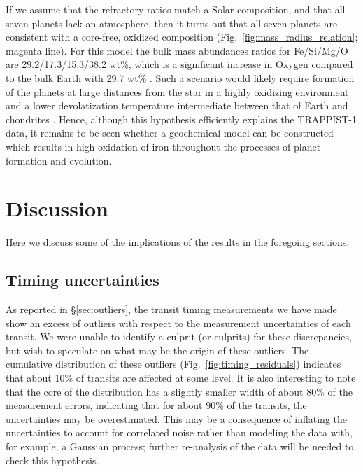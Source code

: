 \documentclass[twocolumn]{aastex63}
\begin{document}
If we assume that the refractory ratios match a Solar composition, and that all seven planets lack an atmosphere, then it turns out that all seven planets are consistent with a core-free, oxidized composition (Fig.\ \ref{fig:mass_radius_relation}; magenta line).  For this model the bulk mass abundances ratios for Fe/Si/Mg/O are 29.2/17.3/15.3/38.2 wt\%, which is a significant increase in Oxygen compared to the bulk Earth with 29.7 wt\% \citep{McDonough2014}.
Such a scenario would likely require formation of the planets at large distances from the star in a highly oxidizing environment \citep{ElkinsTanton2008} and a lower  devolatization temperature intermediate between that of Earth and chondrites \citep{Wang2019}.  Hence, although this hypothesis efficiently explains the TRAPPIST-1 data, it remains to be seen whether a geochemical model can be constructed which results in high oxidation of iron throughout the processes of planet formation and evolution.

\section{Discussion} \label{sec:discussion}

Here we discuss some of the implications of the results in the foregoing sections.

\subsection{Timing uncertainties}

As reported in \S \ref{sec:outliers}, the transit timing measurements we have made show an excess of outliers with respect to the measurement uncertainties of each transit.  We were unable to identify a culprit (or culprits) for these discrepancies, but wish to speculate on what may be the origin of these outliers.  The cumulative distribution of these outliers (Fig.\ \ref{fig:timing_residuals}) indicates that about 10\% of transits
are affected at some level.  It is also interesting to note that the core of the distribution has a slightly smaller width of about 80\% of the measurement errors, indicating that for about 90\% of the transits, the uncertainties may be overestimated.  This may be a consequence of inflating the uncertainties to account for correlated noise rather than modeling the data with, for example, a Gaussian process;  further re-analysis of the data will be needed to check this hypothesis.
\end{document}
